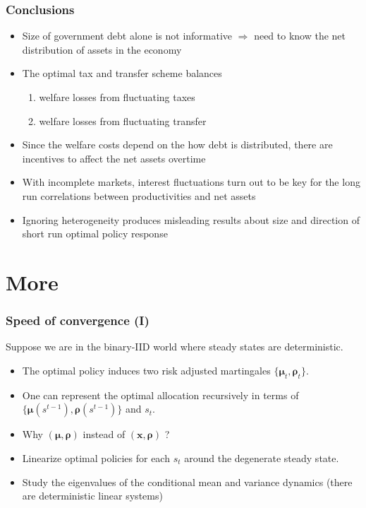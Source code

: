 \documentclass{beamer}
\begin{document}
\begin{frame}
 \frametitle{Conclusions}
\begin{itemize}
\item Size of government debt alone is not informative $\Longrightarrow $
need to know the net distribution of assets in the economy
\item The optimal tax and transfer scheme balances 
\begin{enumerate}
 \item welfare losses from fluctuating taxes
 \item welfare losses from fluctuating transfer
\end{enumerate}
\item Since the welfare costs depend on the how debt is distributed, there are incentives to affect the net assets overtime
\item With incomplete markets, interest fluctuations turn out to be key for the long run correlations between productivities and net assets
\item Ignoring heterogeneity produces misleading results about size and direction of short run optimal policy response
\end{itemize}

\end{frame}
\appendix
\section{More}

\begin{frame}[label=convergence]
\frametitle{Speed of convergence  (I) }
Suppose we are in the binary-IID world where steady states are deterministic. 


\begin{itemize}
\item The optimal policy induces two risk adjusted martingales $\{\bm{\mu}_{t},\bm{\rho}_{t}\}$. 
 \item One can represent the optimal allocation recursively in terms of $\{\bm \mu(s^{t-1}),\bm \rho(s^{t-1})\}$ and $s_t$. 
\item Why $(\bm{\mu},\bm{\rho})$ instead of $(\bm{x},\bm{\rho})$ ?
\item Linearize optimal policies for each $s_t$ around the degenerate steady state. 
\item Study the eigenvalues of the conditional mean and variance dynamics (there are deterministic linear systems)
\end{itemize}

\end{frame}
\end{document}
